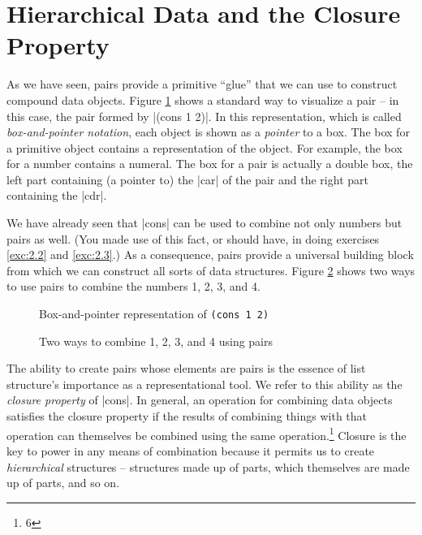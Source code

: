 
\section{Hierarchical Data and the Closure Property}
\label{sec:2.2}

As we have seen, pairs provide a primitive ``glue'' that we can use to
construct compound data objects.  Figure \ref{fig:2.2} shows a
standard way to visualize a pair -- in this case, the pair formed by
\scheme|(cons 1 2)|.  In this representation, which is called
\textit{box-and-pointer notation}, each object is shown as a
\textit{pointer} to a box.  The box for a primitive object contains a
representation of the object.  For example, the box for a number
contains a numeral.  The box for a pair is actually a double box, the
left part containing (a pointer to) the \scheme|car| of the pair and
the right part containing the \scheme|cdr|.


We have already seen that \scheme|cons| can be used to combine not
only numbers but pairs as well.  (You made use of this fact, or
should have, in doing exercises \ref{exc:2.2}
and \ref{exc:2.3}.)  As a consequence, pairs provide a universal
building block from which we can construct all sorts of data
structures.  Figure \ref{fig:2.3} shows two ways
to use pairs to combine the numbers 1, 2, 3, and 4.

\begin{figure}
\centering
\placeholder
\caption{Box-and-pointer representation of \texttt{(cons 1 2)}}
\label{fig:2.2}
\end{figure}

\begin{figure}
\centering
\placeholder
\caption{Two ways to combine 1, 2, 3, and 4 using pairs}
\label{fig:2.3}
\end{figure}

The ability to create pairs whose elements are pairs is the essence of
list structure's importance as a representational tool.  We refer to
this ability as the \textit{closure property} of \scheme|cons|.  In
general, an operation for combining data objects satisfies the closure
property if the results of combining things with that operation can
themselves be combined using the same operation.\footnote{6} Closure
is the key to power in any means of combination because it permits us
to create \textit{hierarchical} structures -- structures made up of
parts, which themselves are made up of parts, and so on.

